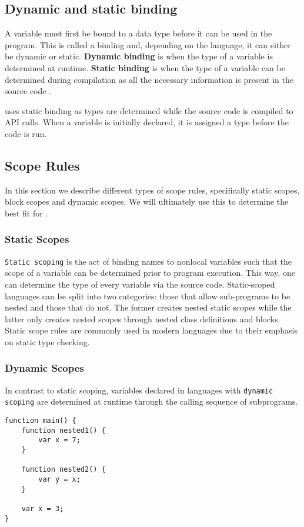 \subsection*{Dynamic and static binding}
A variable must first be bound to a data type before it can be used in the program. 
This is called a binding and, depending on the language, it can either be dynamic or static.
\textbf{Dynamic binding} is when the type of a variable is determined at runtime. 
\textbf{Static binding} is when the type of a variable can be determined during compilation as all the necessary information is present in the source code \cite{sebesta_concepts_2016}.

\dazel{} uses static binding as types are determined while the source code is compiled to API calls. When a variable is initially declared, it is assigned a type before the code is run.

\subsection{Scope Rules}
In this section we describe different types of scope rules, specifically static scopes, block scopes and dynamic scopes.
We will ultimately use this to determine the best fit for \dazel{}.

\subsubsection{Static Scopes}
\texttt{Static scoping} is the act of binding names to nonlocal variables such that the scope of a variable
can be determined prior to program execution. This way, one can determine the type of every variable via the source code.
Static-scoped languages can be split into two categories: those that allow sub-programs to be nested and those that do not.
The former creates nested static scopes while the latter only creates nested scopes through nested class definitions and blocks.
Static scope rules are commonly used in modern languages due to their emphasis on static type checking\cite{sebesta_concepts_2016}.

\subsubsection{Dynamic Scopes}
In contrast to static scoping, variables declared in languages with \texttt{dynamic scoping} are determined at runtime through the calling sequence of subprograms.

\begin{lstlisting}[language=CSharp, caption={Example of dynamic scoping}, label={lst:DynamicScopeExample}]
function main() {
	function nested1() {
		var x = 7;
	}
	
	function nested2() {
		var y = x;
	}

	var x = 3; 
}
\end{lstlisting}

